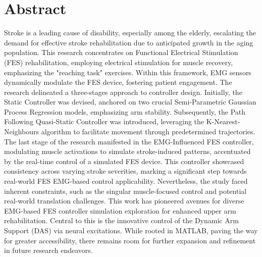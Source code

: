 \section*{Abstract}
Stroke is a leading cause of disability, especially among the elderly, escalating the demand for effective stroke rehabilitation due to anticipated growth in the aging population. This research concentrates on Functional Electrical Stimulation (FES) rehabilitation, employing electrical stimulation for muscle recovery, emphasizing the "reaching task" exercises. Within this framework, EMG sensors dynamically modulate the FES device, fostering patient engagement. The research delineated a three-stages approach to controller design. Initially, the Static Controller was devised, anchored on two crucial Semi-Parametric Gaussian Process Regression models, emphasizing arm stability. Subsequently, the Path Following Quasi-Static Controller was introduced, leveraging the K-Nearest-Neighbours algorithm to facilitate movement through predetermined trajectories. The last stage of the research manifested in the EMG-Influenced FES controller, modulating muscle activations to simulate stroke-induced patterns, accentuated by the real-time control of a simulated FES device. This controller showcased consistency across varying stroke severities, marking a significant step towards real-world FES EMG-based control applicability. Nevertheless, the study faced inherent constraints, such as the singular muscle-focused control and potential real-world translation challenges. This work has pioneered avenues for diverse EMG-based FES controller simulation exploration for enhanced upper arm rehabilitation. Central to this is the innovative control of the Dynamic Arm Support (DAS) via neural excitations. While rooted in MATLAB, paving the way for greater accessibility, there remains room for further expansion and refinement in future research endeavors.





